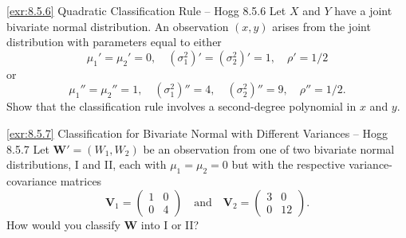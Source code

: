 \begin{exercise}{\ref{exr:8.5.6} Quadratic Classification Rule -- Hogg 8.5.6}\label{exr:8.5.6}
Let $X$ and $Y$ have a joint bivariate normal distribution. An observation $(x, y)$ arises from the joint distribution with parameters equal to either
\[
\mu_1' = \mu_2' = 0, \quad (\sigma_1^2)' = (\sigma_2^2)' = 1, \quad \rho' = 1/2
\]
or
\[
\mu_1'' = \mu_2'' = 1, \quad (\sigma_1^2)'' = 4, \quad (\sigma_2^2)'' = 9, \quad \rho'' = 1/2.
\]
Show that the classification rule involves a second-degree polynomial in $x$ and $y$.
\end{exercise}

\begin{exercise}{\ref{exr:8.5.7} Classification for Bivariate Normal with Different Variances -- Hogg 8.5.7}\label{exr:8.5.7}
Let $\mathbf{W}' = (W_1, W_2)$ be an observation from one of two bivariate normal distributions, I and II, each with $\mu_1 = \mu_2 = 0$ but with the respective variance-covariance matrices
\[
\mathbf{V}_1 = \begin{pmatrix} 1 & 0 \\ 0 & 4 \end{pmatrix} \quad \text{and} \quad \mathbf{V}_2 = \begin{pmatrix} 3 & 0 \\ 0 & 12 \end{pmatrix}.
\]
How would you classify $\mathbf{W}$ into I or II?
\end{exercise}


